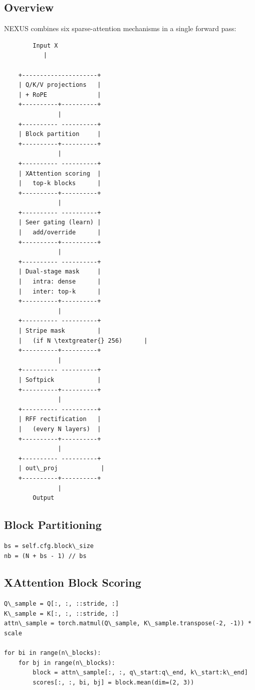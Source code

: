 \subsection{Overview}

NEXUS combines six sparse-attention mechanisms in a single forward pass:

\begin{lstlisting}
        Input X
           |
            
    +---------------------+
    | Q/K/V projections   |
    | + RoPE              |
    +----------+----------+
               |
    +---------- ----------+
    | Block partition     |
    +----------+----------+
               |
    +---------- ----------+
    | XAttention scoring  |
    |   top-k blocks      |
    +----------+----------+
               |
    +---------- ----------+
    | Seer gating (learn) |
    |   add/override      |
    +----------+----------+
               |
    +---------- ----------+
    | Dual-stage mask     |
    |   intra: dense      |
    |   inter: top-k      |
    +----------+----------+
               |
    +---------- ----------+
    | Stripe mask         |
    |   (if N \textgreater{} 256)      |
    +----------+----------+
               |
    +---------- ----------+
    | Softpick            |
    +----------+----------+
               |
    +---------- ----------+
    | RFF rectification   |
    |   (every N layers)  |
    +----------+----------+
               |
    +---------- ----------+
    | out\_proj            |
    +----------+----------+
               |
        Output
\end{lstlisting}

\subsection{Block Partitioning}

\begin{lstlisting}
bs = self.cfg.block\_size
nb = (N + bs - 1) // bs
\end{lstlisting}

\subsection{XAttention Block Scoring}

\begin{lstlisting}
Q\_sample = Q[:, :, ::stride, :]
K\_sample = K[:, :, ::stride, :]
attn\_sample = torch.matmul(Q\_sample, K\_sample.transpose(-2, -1)) * scale

for bi in range(n\_blocks):
    for bj in range(n\_blocks):
        block = attn\_sample[:, :, q\_start:q\_end, k\_start:k\_end]
        scores[:, :, bi, bj] = block.mean(dim=(2, 3))
\end{lstlisting}


